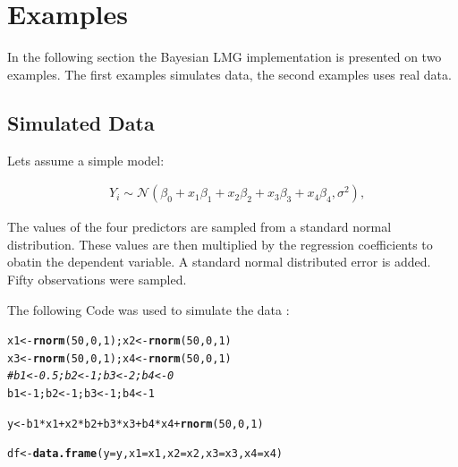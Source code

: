 \documentclass[11pt,a4paper,twoside]{book}\usepackage[]{graphicx}\usepackage[]{color}
\makeatletter
\newcommand{\hlnum}[1]{\textcolor[rgb]{0.686,0.059,0.569}{#1}}%
\newcommand{\hlcom}[1]{\textcolor[rgb]{0.678,0.584,0.686}{\textit{#1}}}%
\newcommand{\hlopt}[1]{\textcolor[rgb]{0,0,0}{#1}}%
\newcommand{\hlstd}[1]{\textcolor[rgb]{0.345,0.345,0.345}{#1}}%
\newcommand{\hlkwb}[1]{\textcolor[rgb]{0.69,0.353,0.396}{#1}}%
\newcommand{\hlkwc}[1]{\textcolor[rgb]{0.333,0.667,0.333}{#1}}%
\newcommand{\hlkwd}[1]{\textcolor[rgb]{0.737,0.353,0.396}{\textbf{#1}}}%
\newenvironment{kframe}{%
 \def\at@end@of@kframe{}%
 \ifinner\ifhmode%
  \def\at@end@of@kframe{\end{minipage}}%
  \begin{minipage}{\columnwidth}%
 \fi\fi%
 \def\FrameCommand##1{\hskip\@totalleftmargin \hskip-\fboxsep
 \colorbox{shadecolor}{##1}\hskip-\fboxsep
     \hskip-\linewidth \hskip-\@totalleftmargin \hskip\columnwidth}%
 \MakeFramed {\advance\hsize-\width
   \@totalleftmargin\z@ \linewidth\hsize
   \@setminipage}}%
 {\par\unskip\endMakeFramed%
 \at@end@of@kframe}
\newenvironment{knitrout}{}{} %
\makeatother
\begin{document}






\chapter{Examples}

In the following section the Bayesian LMG implementation is presented on two examples. The first examples simulates data, the second examples uses real data.

\section{Simulated Data}

Lets assume a simple model: 

\begin{align} 
&Y_{i} \sim \mathcal{N}(\beta_{0}+x_{1} \beta_{1}+x_{2} \beta_{2}+x_{3} \beta_{3}+x_{4} \beta_{4}, \sigma^2),
\end{align} 


The values of the four predictors are sampled from a standard normal distribution. These values are then multiplied by the regression coefficients to obatin the dependent variable. A standard normal distributed error is added. Fifty observations were sampled.

The following Code was used to simulate the data :

\begin{knitrout}
\color{fgcolor}\begin{kframe}
\begin{alltt}
\hlstd{x1} \hlkwb{<-} \hlkwd{rnorm}\hlstd{(}\hlnum{50}\hlstd{,} \hlnum{0}\hlstd{,} \hlnum{1}\hlstd{); x2} \hlkwb{<-} \hlkwd{rnorm}\hlstd{(}\hlnum{50}\hlstd{,} \hlnum{0}\hlstd{,} \hlnum{1}\hlstd{)}
\hlstd{x3} \hlkwb{<-} \hlkwd{rnorm}\hlstd{(}\hlnum{50}\hlstd{,} \hlnum{0}\hlstd{,} \hlnum{1}\hlstd{); x4} \hlkwb{<-} \hlkwd{rnorm}\hlstd{(}\hlnum{50}\hlstd{,} \hlnum{0}\hlstd{,} \hlnum{1}\hlstd{)}
\hlcom{#b1 <- 0.5; b2 <- 1; b3 <- 2; b4 <- 0}
\hlstd{b1} \hlkwb{<-} \hlnum{1}\hlstd{; b2} \hlkwb{<-} \hlnum{1}\hlstd{; b3} \hlkwb{<-} \hlnum{1}\hlstd{; b4} \hlkwb{<-} \hlnum{1}

\hlstd{y} \hlkwb{<-} \hlstd{b1}\hlopt{*}\hlstd{x1} \hlopt{+} \hlstd{x2}\hlopt{*}\hlstd{b2} \hlopt{+} \hlstd{b3}\hlopt{*}\hlstd{x3} \hlopt{+} \hlstd{b4}\hlopt{*}\hlstd{x4} \hlopt{+} \hlkwd{rnorm}\hlstd{(}\hlnum{50}\hlstd{,} \hlnum{0}\hlstd{,} \hlnum{1}\hlstd{)}

\hlstd{df} \hlkwb{<-} \hlkwd{data.frame}\hlstd{(}\hlkwc{y} \hlstd{= y,} \hlkwc{x1} \hlstd{= x1,} \hlkwc{x2} \hlstd{= x2,} \hlkwc{x3} \hlstd{= x3,} \hlkwc{x4} \hlstd{= x4)}
\end{alltt}
\end{kframe}
\end{knitrout}
\end{document}
